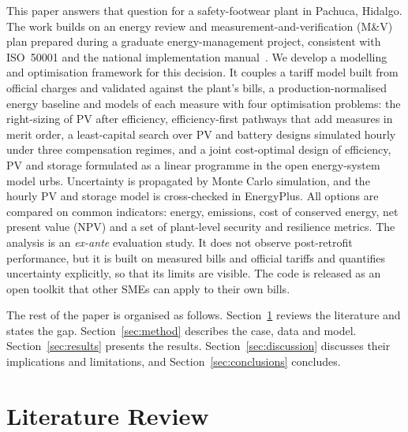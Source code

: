 \documentclass[processes,article,submit,pdftex,moreauthors]{Definitions/mdpi}
\begin{document}
This paper answers that question for a safety-footwear plant in Pachuca, Hidalgo. The work builds on an energy review and measurement-and-verification (M\&V) plan prepared during a graduate energy-management project, consistent with ISO~50001 and the national implementation manual~\cite{iso50001,conuee2022}. We develop a modelling and optimisation framework for this decision. It couples a tariff model built from official charges and validated against the plant's bills, a production-normalised energy baseline and models of each measure with four optimisation problems: the right-sizing of PV after efficiency, efficiency-first pathways that add measures in merit order, a least-capital search over PV and battery designs simulated hourly under three compensation regimes, and a joint cost-optimal design of efficiency, PV and storage formulated as a linear programme in the open energy-system model urbs. Uncertainty is propagated by Monte Carlo simulation, and the hourly PV and storage model is cross-checked in EnergyPlus. All options are compared on common indicators: energy, emissions, cost of conserved energy, net present value (NPV) and a set of plant-level security and resilience metrics. The analysis is an \emph{ex-ante} evaluation study. It does not observe post-retrofit performance, but it is built on measured bills and official tariffs and quantifies uncertainty explicitly, so that its limits are visible. The code is released as an open toolkit that other SMEs can apply to their own bills.

The rest of the paper is organised as follows. Section~\ref{sec:lit} reviews the literature and states the gap. Section~\ref{sec:method} describes the case, data and model. Section~\ref{sec:results} presents the results. Section~\ref{sec:discussion} discusses their implications and limitations, and Section~\ref{sec:conclusions} concludes.

\section{Literature Review}
\label{sec:lit}
\end{document}
